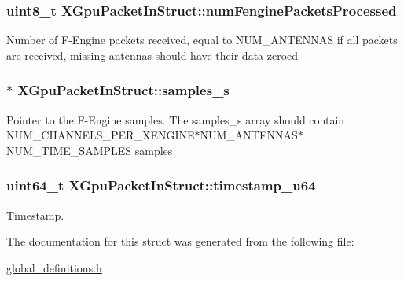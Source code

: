 \subsubsection[{\texorpdfstring{num\+Fengine\+Packets\+Processed}{numFenginePacketsProcessed}}]{\setlength{\rightskip}{0pt plus 5cm}uint8\+\_\+t X\+Gpu\+Packet\+In\+Struct\+::num\+Fengine\+Packets\+Processed}\hypertarget{struct_x_gpu_packet_in_struct_af91c1a16261264fedf825dedb28ec037}{}\label{struct_x_gpu_packet_in_struct_af91c1a16261264fedf825dedb28ec037}
Number of F-\/\+Engine packets received, equal to N\+U\+M\+\_\+\+A\+N\+T\+E\+N\+N\+AS if all packets are received, missing antennas should have their data zeroed 
\subsubsection[{\texorpdfstring{samples\+\_\+s}{samples_s}}]{$\ast$ X\+Gpu\+Packet\+In\+Struct\+::samples\+\_\+s}\hypertarget{struct_x_gpu_packet_in_struct_af64b52e9201cc30d39113a3b888a707e}{}\label{struct_x_gpu_packet_in_struct_af64b52e9201cc30d39113a3b888a707e}
Pointer to the F-\/\+Engine samples. The samples\+\_\+s array should contain N\+U\+M\+\_\+\+C\+H\+A\+N\+N\+E\+L\+S\+\_\+\+P\+E\+R\+\_\+\+X\+E\+N\+G\+I\+N\+E$\ast$\+N\+U\+M\+\_\+\+A\+N\+T\+E\+N\+N\+A\+S$\ast$\+N\+U\+M\+\_\+\+T\+I\+M\+E\+\_\+\+S\+A\+M\+P\+L\+ES samples 
\subsubsection[{\texorpdfstring{timestamp\+\_\+u64}{timestamp_u64}}]{\setlength{\rightskip}{0pt plus 5cm}uint64\+\_\+t X\+Gpu\+Packet\+In\+Struct\+::timestamp\+\_\+u64}\hypertarget{struct_x_gpu_packet_in_struct_a3e77083a74a6582d5c3b92c161acdd90}{}\label{struct_x_gpu_packet_in_struct_a3e77083a74a6582d5c3b92c161acdd90}
Timestamp. 

The documentation for this struct was generated from the following file\+:\begin{DoxyCompactItemize}
\item 
\hyperlink{global__definitions_8h}{global\+\_\+definitions.\+h}\end{DoxyCompactItemize}
